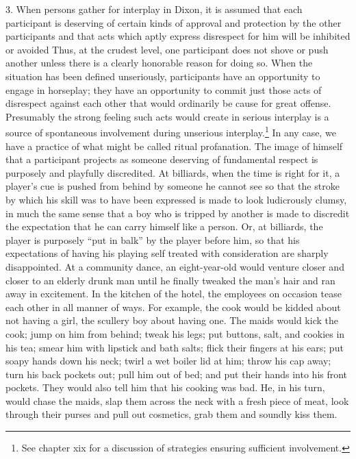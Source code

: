 \documentclass[twoside,symmetric,nobib,justified]{tufte-book}
\begin{document}
3. When persons gather for interplay in Dixon, it is assumed that each
participant is deserving of certain kinds of approval and protection by
the other participants and that acts which aptly express disrespect for
him will be inhibited or avoided Thus, at the crudest level, one
participant does not shove or push another unless there is a clearly
honorable reason for doing so. When the situation has been defined
unseriously, participants have an opportunity to engage in horseplay;
they have an opportunity to commit just those acts of disrespect against
each other that would ordinarily be cause for great offense. Presumably
the strong feeling such acts would create in serious interplay is a
source of spontaneous involvement during unserious interplay.\footnote{See
  chapter xix for a discussion of strategies ensuring sufficient
  involvement.} In any case, we have a practice of what might be called
ritual profanation. The image of himself that a participant projects as
someone deserving of fundamental respect is purposely and playfully
discredited. At billiards, when the time is right for it, a player's cue
is pushed from behind by someone he cannot see so that the stroke by
which his skill was to have been expressed is made to look ludicrously
clumsy, in much the same sense that a boy who is tripped by another is
made to discredit the expectation that he can carry himself like a
person. Or, at billiards, the player is purposely ``put in balk'' by the
player before him, so that his expectations of having his playing self
treated with consideration are sharply disappointed. At a community
dance, an eight-year-old would venture closer and closer to an elderly
drunk man until he finally tweaked the man's hair and ran away in
excitement. In the kitchen of the hotel, the employees on occasion tease
each other in all manner of ways. For example, the cook would be kidded
about not having a girl, the scullery boy about having one. The maids
would kick the cook; jump on him from behind; tweak his legs; put
buttons, salt, and cookies in his tea; smear him with lipstick and bath
salts; flick their fingers at his ears; put soapy hands down his neck;
twirl a wet boiler lid at him; throw his cap away; turn his back pockets
out; pull him out of bed; and put their hands into his front pockets.
They would also tell him that his cooking was bad. He, in his turn,
would chase the maids, slap them across the neck with a fresh piece of
meat, look through their purses and pull out cosmetics, grab them and
soundly kiss them.
\end{document}

